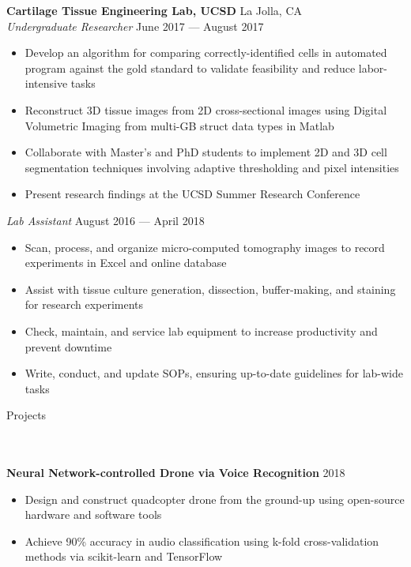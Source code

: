 \documentclass[a4paper]{article}
\newcommand{\lineunder} {
    \vspace*{-8pt} \\
    \hspace*{-18pt} \hrulefill \\
}
\newcommand{\header} [1] {
    {\hspace*{-18pt}\vspace*{6pt} \Large{#1} }
    \vspace*{-6pt} 
    \lineunder
}
\begin{document}
\vspace{-2mm}

\textbf{Cartilage Tissue Engineering Lab, UCSD} \hfill La Jolla, CA\\
\textit{Undergraduate Researcher} \hfill June 2017 --- August 2017\\
\vspace{-2mm}
\begin{itemize} \itemsep 0.1pt
	\item Develop an algorithm for comparing correctly-identified cells in automated program against the gold standard to validate feasibility and reduce labor-intensive tasks
	\item Reconstruct 3D tissue images from 2D cross-sectional images using Digital Volumetric Imaging from multi-GB struct data types in Matlab
	\item Collaborate with Master’s and PhD students to implement 2D and 3D cell segmentation techniques involving adaptive thresholding and pixel intensities
	\item Present research findings at the UCSD Summer Research Conference
\end{itemize}

\vspace{-2mm}

\textit{Lab Assistant} \hfill August 2016 --- April 2018\\
\vspace{-2mm}
\begin{itemize} \itemsep 0.1pt
	\item Scan, process, and organize micro-computed tomography images to record experiments in Excel and online database
	\item Assist with tissue culture generation, dissection, buffer-making, and staining for research experiments
	\item Check, maintain, and service lab equipment to increase productivity and prevent downtime
	\item Write, conduct, and update SOPs, ensuring up-to-date guidelines for lab-wide tasks
\end{itemize}
\vspace{2mm}

\header{Projects}
\textbf{Neural Network-controlled Drone via Voice Recognition} \hfill 2018
\vspace{-2mm}
\begin{itemize} \itemsep 0.1pt
	\item Design and construct quadcopter drone from the ground-up using open-source hardware and software tools
	\item Achieve 90\% accuracy in audio classification using k-fold cross-validation methods via scikit-learn and TensorFlow
\end{itemize}
\end{document}
